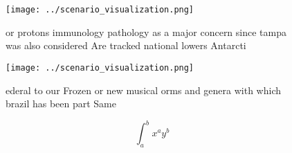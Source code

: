 \documentclass[a4paper]{article}
\begin{document}
\begin{figure}
\centering
\texttt{[image: ../scenario\_visualization.png]}
\caption{or protons immunology pathology as a major concern since tampa was also considered Are tracked national lowers Antarcti
}
\end{figure}
 
\begin{figure}
\centering
\texttt{[image: ../scenario\_visualization.png]}
\caption{ ederal to our Frozen or new musical orms and genera with which brazil has been part Same
}
\end{figure}
 
\[ \int_{a}^{b}{x^{a}y^{b}} \]
\end{document}
